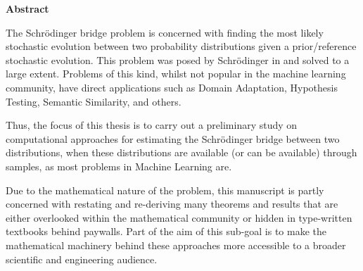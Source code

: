 \newpage
{\Huge \bf Abstract}
\vspace{24pt} 


The Schrödinger bridge problem is concerned with finding the most likely stochastic evolution between two probability distributions given a prior/reference stochastic evolution. This problem was posed by Schrödinger in \cite{schrodinger1931uber,schrodinger1932theorie} and solved to a large extent. Problems of this kind, whilst not popular in the machine learning community, have direct applications such as Domain Adaptation, Hypothesis Testing, Semantic Similarity, and others.

Thus, the focus of this thesis is to carry out a preliminary study on computational approaches for estimating the Schrödinger bridge between two distributions, when these distributions are available (or can be available) through samples, as most problems in Machine Learning are.

Due to the mathematical nature of the problem, this manuscript is partly concerned with restating and re-deriving many theorems and results that are either overlooked within the mathematical community or hidden in type-written textbooks behind paywalls. Part of the aim of this sub-goal is to make the mathematical machinery behind these approaches more accessible to a broader scientific and engineering audience.

\newpage
\vspace*{\fill}
